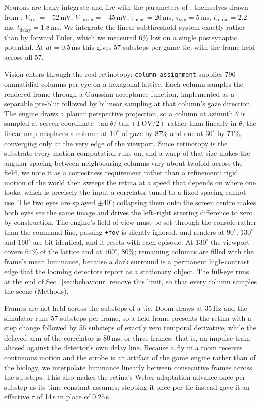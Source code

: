\documentclass[10pt,twoside]{article}
\begin{document}
Neurons are leaky integrate-and-fire with the parameters of \citet{shiu2024},
themselves drawn from \citet{kakaria2017}: $V_{\mathrm{rest}}=-52$\,mV,
$V_{\mathrm{thresh}}=-45$\,mV, $\tau_{\mathrm{mem}}=20$\,ms,
$\tau_{\mathrm{syn}}=5$\,ms, $t_{\mathrm{refrac}}=2.2$\,ms,
$t_{\mathrm{delay}}=1.8$\,ms. We integrate the linear subthreshold system
exactly rather than by forward Euler, which we measured 6\% low on a single
postsynaptic potential. At $dt=0.5$\,ms this gives 57 substeps per game tic,
with the frame held across all 57.

Vision enters through the real retinotopy: \texttt{column\_assignment} supplies
796 ommatidial columns per eye on a hexagonal lattice. Each column samples the
rendered frame through a Gaussian acceptance function, implemented as a
separable pre-blur followed by bilinear sampling at that column's gaze
direction. The engine draws a planar perspective projection, so a column at
azimuth $\theta$ is sampled at screen coordinate $\tan\theta/\tan(\mathrm{FOV}/2)$
rather than linearly in $\theta$; the linear map misplaces a column at
$10^\circ$ of gaze by 87\% and one at $30^\circ$ by 71\%, converging only at
the very edge of the viewport. Since retinotopy is the substrate every motion
computation runs on, and a warp of that size makes the angular spacing between
neighbouring columns vary about twofold across the field, we note it as a
correctness requirement rather than a refinement: rigid motion of the world
then sweeps the retina at a speed that depends on where one looks, which is
precisely the input a correlator tuned to a fixed spacing cannot use. The two
eyes are splayed $\pm40^\circ$; collapsing them onto the
screen centre makes both eyes see the same image and drives the left--right
steering difference to zero by construction. The engine's field of view must
be set through the
console rather than the command line, passing \texttt{+fov} is silently
ignored, and renders at $90^\circ$, $130^\circ$ and $160^\circ$ are
bit-identical, and it resets with each episode. At $130^\circ$ the viewport
covers 64\% of the lattice and at $160^\circ$, 80\%; remaining columns are
filled with the frame's mean luminance, because a dark surround is a permanent
high-contrast edge that the looming detectors report as a stationary object.
The full-eye runs at the end of Sec.~\ref{sec:behaviour} remove this limit, so
that every column samples the scene (Methods).

Frames are not held across the substeps of a tic. Doom draws at 35\,Hz and the
simulator runs 57 substeps per frame, so a held frame presents the retina with
a step change followed by 56 substeps of exactly zero temporal derivative,
while the delayed arm of the correlator is 80\,ms, or three frames: that is,
an impulse train aliased against the detector's own delay line. Because a fly
in a room receives continuous motion and the strobe is an artifact of the game
engine rather than of the biology, we interpolate luminance linearly between
consecutive frames across the substeps. This also makes the retina's Weber
adaptation advance once per substep as its time constant assumes; stepping it
once per tic instead gave it an effective $\tau$ of 14\,s in place of
$0.25$\,s.
\end{document}
